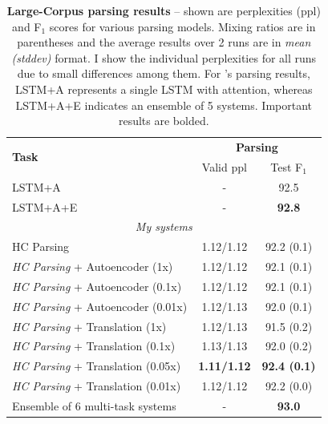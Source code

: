 \begin{table}[tbh!]
\centering
\begin{tabular}{l|c|c}
\multirow{ 2}{*}{\bf{Task}}& \multicolumn{2}{c}{{\bf
Parsing}}\\
  \cline{2-3}
  & Valid ppl & Test F$_1$\\
  \hline
  \hline
LSTM+A \citep{vinyals15grammar} &  - & 92.5 \\
LSTM+A+E \citep{vinyals15grammar} & - & {\bf 92.8} \\
  \hline
\multicolumn{3}{c}{{\it My systems}} \\
  \hline
HC Parsing & 1.12/1.12 & 92.2 (0.1) \\
  \hline
{\it HC Parsing} + Autoencoder (1x) & 1.12/1.12 & 92.1 (0.1) \\
{\it HC Parsing} + Autoencoder (0.1x) & 1.12/1.12 & 92.1 (0.1) \\
{\it HC Parsing} + Autoencoder (0.01x) & 1.12/1.13 & 92.0 (0.1) \\
  \hline
{\it HC Parsing} + Translation (1x) & 1.12/1.13 & 91.5 (0.2) \\
{\it HC Parsing} + Translation (0.1x) & 1.13/1.13 & 92.0 (0.2) \\
{\it HC Parsing} + Translation (0.05x) & {\bf 1.11/1.12} & {\bf 92.4 (0.1)} \\
{\it HC Parsing} + Translation (0.01x) & 1.12/1.12 & 92.2 (0.0) \\
  \hline
Ensemble of 6 multi-task systems & - & {\bf 93.0} \\
\end{tabular}
\caption[Large-Corpus parsing results \& translation]{{\bf Large-Corpus parsing results} -- shown are
perplexities (ppl) and F$_1$ scores 
for various parsing models. Mixing ratios are in parentheses and the average
results over 2 runs are in {\it mean (stddev)} format. I show the individual perplexities for all runs
due to small differences among them. For \citet{vinyals15grammar}'s parsing results, LSTM+A
represents a single LSTM with attention, whereas LSTM+A+E indicates an ensemble
of 5 systems. Important results are bolded.}
\label{t:big_big_parsing}
\end{table}

